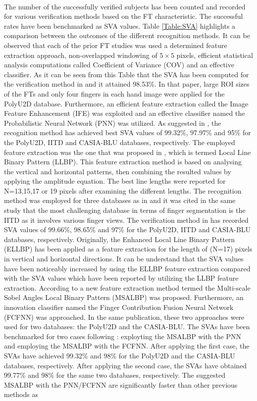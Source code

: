 \documentclass[conference]{IEEEtran}
\begin{document}
\\
The number of the successfully verified subjects has been counted and recorded for various verification methods based on the FT characteristic. The successful rates have been benchmarked as SVA values. Table \ref{Table:SVA} highlights a comparison between the outcomes of the different recognition methods. It can be observed that each of the prior FT studies was used a determined feature extraction approach, non-overlapped windowing of $5 \times 5$ pixels, efficient statistical analysis computations called Coefficient of Variance (COV) and an effective classifier. As it can be seen from this Table that the SVA has been computed for the verification method in \cite{Al-Nima2015Human} and it attained 98.53\%. In that paper, large ROI sizes of the FTs and only four fingers in each hand image were applied for the PolyU2D database. Furthermore, an efficient feature extraction called the Image Feature Enhancement (IFE) was exploited and an effective classifier named the Probabilistic Neural Network (PNN) was utilized. As suggested in \cite{Al-Nima2017efficient}, the recognition method has achieved best SVA values of 99.32\%, 97.97\% and 95\% for the PolyU2D, IITD and CASIA-BLU databases, respectively. The employed feature extraction was the one that was proposed in \cite{Petpon2009Face}, which is termed Local Line Binary Pattern (LLBP). This feature extraction method is based on analysing the vertical and horizontal patterns, then combining the resulted values by applying the amplitude equation. The best line lengths were reported for N=13,15,17 or 19 pixels after examining the different lengths. The recognition method was employed for three databases as in \cite{Al-Nima2017efficient} and it was cited in the same study that the most challenging database in terms of finger segmentation is the IITD as it involves various finger views. The verification method in \cite{Al-Nima2016Robust} has recorded SVA values of 99.66\%, 98.65\% and 97\% for the PolyU2D, IITD and CASIA-BLU databases, respectively. Originally, the Enhanced Local Line Binary Pattern (ELLBP) has been applied as a feature extraction for the length of (N=17) pixels in vertical and horizontal directions. It can be understand that the SVA values have been noticeably increased by using the ELLBP feature extraction compared with the SVA values which have been reported by utilizing the LLBP feature extraction. According to \cite{Al-Nima2017finger} a new feature extraction method termed the Multi-scale Sobel Angles Local Binary Pattern (MSALBP) was proposed. Furthermore, an innovation classifier named the Finger Contribution Fusion Neural Network (FCFNN) was approached. In the same publication, these two approaches were used for two databases: the PolyU2D and the CASIA-BLU. The SVAs have been benchmarked for two cases following \cite{Al-Nima2017finger}: exployting the MSALBP with the PNN and employing the MSALBP with the FCFNN. After applying the first case, the SVAs have achieved 99.32\% and 98\% for the PolyU2D and the CASIA-BLU databases, respectively. After applying the second case, the SVAs have obtained 99.77\% and 98\% for the same two databases, respectively. The suggested MSALBP with the PNN/FCFNN are significantly faster than other previous methods as 
\end{document}
